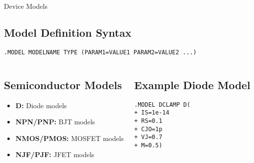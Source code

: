\documentclass{beamer}
\begin{document}
\begin{frame}{Device Models}
    \subsection{Model Definition Syntax}
    \begin{lstlisting}
.MODEL MODELNAME TYPE (PARAM1=VALUE1 PARAM2=VALUE2 ...)
    \end{lstlisting}
    
    \begin{columns}
        \begin{column}{0.5\textwidth}
            \subsection{Semiconductor Models}
            \begin{itemize}
                \item \textbf{D:} Diode models
                \item \textbf{NPN/PNP:} BJT models
                \item \textbf{NMOS/PMOS:} MOSFET models
                \item \textbf{NJF/PJF:} JFET models
            \end{itemize}
        \end{column}
        \begin{column}{0.5\textwidth}
            \subsection{Example Diode Model}
            \begin{lstlisting}
.MODEL DCLAMP D(
+ IS=1e-14
+ RS=0.1
+ CJO=1p
+ VJ=0.7
+ M=0.5)
            \end{lstlisting}
        \end{column}
    \end{columns}
\end{frame}
\end{document}
